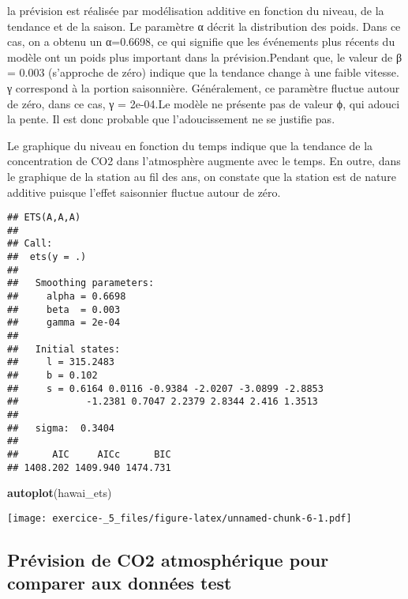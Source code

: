 \documentclass[
]{article}
\newenvironment{Shaded}{\begin{snugshade}}{\end{snugshade}}
\newcommand{\KeywordTok}[1]{\textcolor[rgb]{0.13,0.29,0.53}{\textbf{#1}}}
\newcommand{\NormalTok}[1]{#1}
\newcommand{\OperatorTok}[1]{\textcolor[rgb]{0.81,0.36,0.00}{\textbf{#1}}}
\newcommand{\StringTok}[1]{\textcolor[rgb]{0.31,0.60,0.02}{#1}}
\begin{document}
la prévision est réalisée par modélisation additive en fonction du
niveau, de la tendance et de la saison. Le paramètre α décrit la
distribution des poids. Dans ce cas, on a obtenu un α=0.6698, ce qui
signifie que les événements plus récents du modèle ont un poids plus
important dans la prévision.Pendant que, le valeur de β = 0.003
(s'approche de zéro) indique que la tendance change à une faible
vitesse. γ correspond à la portion saisonnière. Généralement, ce
paramètre fluctue autour de zéro, dans ce cas, γ = 2e-04.Le modèle ne
présente pas de valeur ϕ, qui adouci la pente. Il est donc probable que
l'adoucissement ne se justifie pas.

Le graphique du niveau en fonction du temps indique que la tendance de
la concentration de CO2 dans l'atmosphère augmente avec le temps. En
outre, dans le graphique de la station au fil des ans, on constate que
la station est de nature additive puisque l'effet saisonnier fluctue
autour de zéro.

\begin{Shaded}
\end{Shaded}

\begin{verbatim}
## ETS(A,A,A) 
## 
## Call:
##  ets(y = .) 
## 
##   Smoothing parameters:
##     alpha = 0.6698 
##     beta  = 0.003 
##     gamma = 2e-04 
## 
##   Initial states:
##     l = 315.2483 
##     b = 0.102 
##     s = 0.6164 0.0116 -0.9384 -2.0207 -3.0899 -2.8853
##            -1.2381 0.7047 2.2379 2.8344 2.416 1.3513
## 
##   sigma:  0.3404
## 
##      AIC     AICc      BIC 
## 1408.202 1409.940 1474.731
\end{verbatim}

\begin{Shaded}
\begin{Highlighting}[]
\KeywordTok{autoplot}\NormalTok{(hawai_ets)}
\end{Highlighting}
\end{Shaded}

\texttt{[image: exercice-\_5\_files/figure-latex/unnamed-chunk-6-1.pdf]}

\hypertarget{pruxe9vision-de-co2-atmosphuxe9rique-pour-comparer-aux-donnuxe9es-test}{%
\subsection{Prévision de CO2 atmosphérique pour comparer aux données
test}\label{pruxe9vision-de-co2-atmosphuxe9rique-pour-comparer-aux-donnuxe9es-test}}
\end{document}
